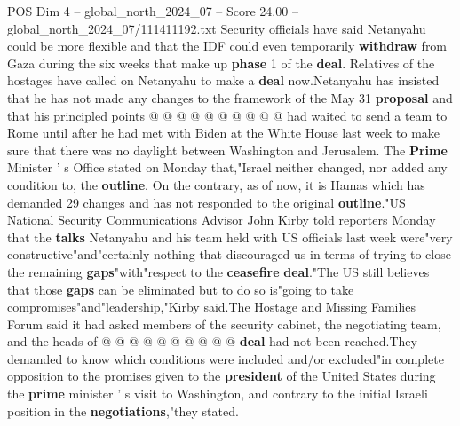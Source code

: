 \begin{textsample}{POS Dim 4 – global\_north\_2024\_07 – Score 24.00 – global\_north\_2024\_07/111411192.txt}
Security officials have said Netanyahu could be more flexible and that the IDF could even temporarily \textbf{withdraw} from Gaza during the six weeks that make up \textbf{phase} 1 of the \textbf{deal}.
Relatives of the hostages have called on Netanyahu to make a \textbf{deal} now.Netanyahu has insisted that he has not made any changes to the framework of the May 31 \textbf{proposal} and that his principled points @ @ @ @ @ @ @ @ @ @ had waited to send a team to Rome until after he had met with Biden at the White House last week to make sure that there was no daylight between Washington and Jerusalem.
The \textbf{Prime} Minister ' s Office stated on Monday that,"Israel neither changed, nor added any condition to, the \textbf{outline}.
On the contrary, as of now, it is Hamas which has demanded 29 changes and has not responded to the original \textbf{outline}."US National Security Communications Advisor John Kirby told reporters Monday that the \textbf{talks} Netanyahu and his team held with US officials last week were"very constructive"and"certainly nothing that discouraged us in terms of trying to close the remaining \textbf{gaps}"with"respect to the \textbf{ceasefire} \textbf{deal}."The US still believes that those \textbf{gaps} can be eliminated but to do so is"going to take compromises"and"leadership,"Kirby said.The Hostage and Missing Families Forum said it had asked members of the security cabinet, the negotiating team, and the heads of @ @ @ @ @ @ @ @ @ @ \textbf{deal} had not been reached.They demanded to know which conditions were included and/or excluded"in complete opposition to the promises given to the \textbf{president} of the United States during the \textbf{prime} minister ' s visit to Washington, and contrary to the initial Israeli position in the \textbf{negotiations},"they stated.

\end{textsample}
